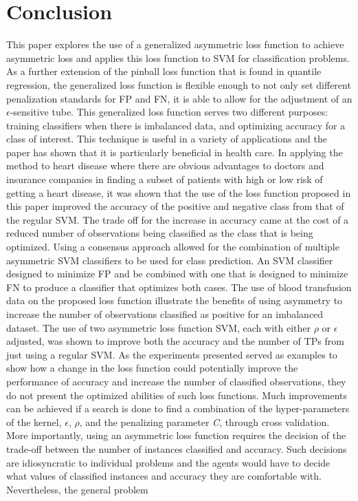 \section{Conclusion}
 This paper explores the use of a generalized asymmetric loss function to achieve asymmetric loss and applies this loss function to SVM for classification problems. As a further extension of the pinball loss function that is found in quantile regression, the generalized loss function is flexible enough to not only set different penalization standards for FP and FN, it is able to allow for the adjustment of an  $\epsilon$-sensitive tube. This generalized loss function serves two different purposes: training classifiers when there is imbalanced data, and optimizing accuracy for a class of interest. This technique is useful in a variety of applications and the paper has shown that it is particularly beneficial in health care. In applying the method to heart disease where there are obvious advantages to doctors and insurance companies in finding a subset of patients with high or low risk of getting a heart disease, it was shown that the use of the loss function proposed in this paper improved the accuracy of the positive and negative class from that of the regular SVM. The trade off for the increase in accuracy came at the cost of a reduced number of observations being classified as the class that is being optimized. Using a consensus approach allowed for the combination of multiple asymmetric SVM classifiers to be used for class prediction. An SVM classifier designed to minimize FP and be combined with one that is designed to minimize FN to produce a classifier that optimizes both cases. The use of blood transfusion data on the proposed loss function illustrate the benefits of using asymmetry to increase the number of observations classified as positive for an imbalanced dataset. The use of two asymmetric loss function SVM, each with either $\rho$ or $\epsilon$ adjusted, was shown to improve both the accuracy and the number of TPs from just using a regular SVM. As the experiments presented served as examples to show how a change in the loss function could potentially improve the performance of accuracy and increase the number of classified observations, they do not present the optimized abilities of such loss functions. Much improvements can be achieved if a search is done to find a combination of the hyper-parameters of the kernel, $\epsilon$, $\rho$, and the penalizing parameter \emph{C}, through cross validation. More importantly, using an asymmetric loss function requires the decision of the trade-off between the number of instances classified and accuracy. Such decisions are idiosyncratic to individual problems and the agents would have to decide what values of classified instances and accuracy they are comfortable with. Nevertheless, the general problem
